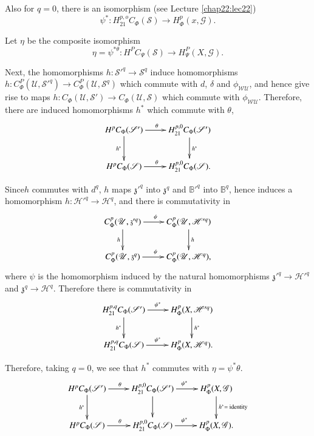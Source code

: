 Also for $q = 0$, there is an isomorphism (see Lecture \ref{chap22:lec22}) 
$$
\psi^* : H^{p,o}_{21} C_\Phi (\mathscr{S}) \to H^p_{\Phi } (x, \mathscr{G}).
$$

Let $\eta$ be the composite isomorphism 
$$
\eta = \psi^{\ast \theta}: H^P C_{\Psi } (\mathscr{S}) \to H^P_\Psi (X,
\mathscr{G}). 
$$

Next, the homomorphisms $ h : \mathscr{S}'^q \to \mathscr{S}^q$
induce homomorphisms $h : C^P_\Phi (\mathscr{U}, \mathscr{S'}^q) \to
C^P_\Phi (\mathscr{U}, \mathscr{S}^q)$ which commute with $d$, $\delta$
and $\phi_{\mathscr{W} \mathscr{U}}$, and hence give rise to maps $h :
C_\Phi (\mathscr{U}, \mathscr{S}') \to C_\Phi (\mathscr{U},
\mathscr{S})$ which commute with $\phi_{\mathscr{W}
  \mathscr{U}}$. Therefore, there are induced homomorphisms $h^*$
which commute with $\theta$,  
\[
\xymatrix{
H^p C_{\Phi} (\mathscr{S}') \ar[r]^{\theta}\ar[d]_{h^{\ast}} &
H^{p,0}_{21} C_{\Phi} (\mathscr{S}')\ar[d]^{h^{\ast}} \\
H^pC_{\Phi} (\mathscr{S}) \ar[r]^{\theta} & H^{p,0}_{21} C_{\Phi}
(\mathscr{S}). 
}
\]

Since\pageoriginale $h$ commutes with $d^q$, $h$ maps $ \mathfrak{z}'^q $ into
$\mathfrak{z}^q$ and $\mathbb{B}'^q$ into $\mathbb{B}^q$, hence induces
a homomorphism $h : \mathscr{H}'^q  \to  \mathscr{H}^q$, and there is
commutativity in  
\[
\xymatrix{
C^p_{\Phi} (\mathscr{U}, \mathfrak{z}'^q)\ar[r]^{\psi}  \ar[d]_h &
C^p_{\Phi} (\mathscr{U}, \mathscr{H}'^q)\ar[d]^h\\
C^p_{\Phi} (\mathscr{U}, \mathfrak{z}^q) \ar[r]^{\psi} & C^p_{\Phi}
(\mathscr{U}, \mathscr{H}^q),
}
\]
where $\psi$ is the homomorphism induced by the natural homomorphisms
$\mathfrak{z}'^q \to \mathscr{H}'^q$ and $\mathfrak{z}^q \to
\mathscr{H}^q$. Therefore there is commutativity in  
\[
\xymatrix{
H^{p,q}_{21} C_{\Phi} (\mathscr{S}') \ar[r]^{\psi^{\ast}}
\ar[d]_{h^{\ast}} & H^p_{\Phi} (X, \mathscr{H}'^q)\ar[d]^{h^{\ast}}\\
H^{p,q}_{21} C_{\Phi} (\mathscr{S}) \ar[r]^{\psi^{\ast}} & H^p_{\Phi}
(X,\mathscr{H}^q) .
}
\]

Therefore, taking $q=0$, we see that $h^*$ commutes with $\eta =
\psi^* \theta$. 
\[
\xymatrix{
H^pC_{\Phi} (\mathscr{S}')  \ar[r]^{\theta} \ar[d]_{h^{\ast}} &
H^{p,0}_{21} C_{\Phi} (\mathscr{S}') \ar[r]^{\psi^{\ast}}\ar[d] &
H^p_{\Phi} (X,\mathscr{G})\ar[d]^{h^{\ast} = \text{ identity}}\\
H^pC_{\Phi} (\mathscr{S}) \ar[r]^{\theta} & H^{p,0}_{21} C_{\Phi}
(\mathscr{S}) \ar[r]^{\psi^{\ast}} & H^p_{\Phi} (X,\mathscr{G}).
}
\]

